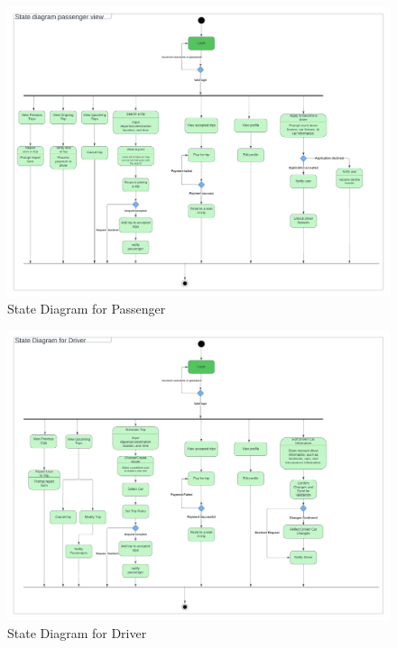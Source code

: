 \documentclass[a4paper, 12pt]{report} %
\begin{document}
        \FloatBarrier
        
        \begin{figure}
            \centering
            \includegraphics[width=\linewidth]{Images/State Diagram passenger.png}
            \caption{State Diagram for Passenger}
            \label{fig:state_passenger}
        \end{figure}

        \FloatBarrier

       \begin{figure}
            \centering
            \includegraphics[width=\linewidth]{Images/State Diagram Driver.png}
            \caption{State Diagram for Driver}
            \label{fig:state_driver}
        \end{figure}
\end{document}

